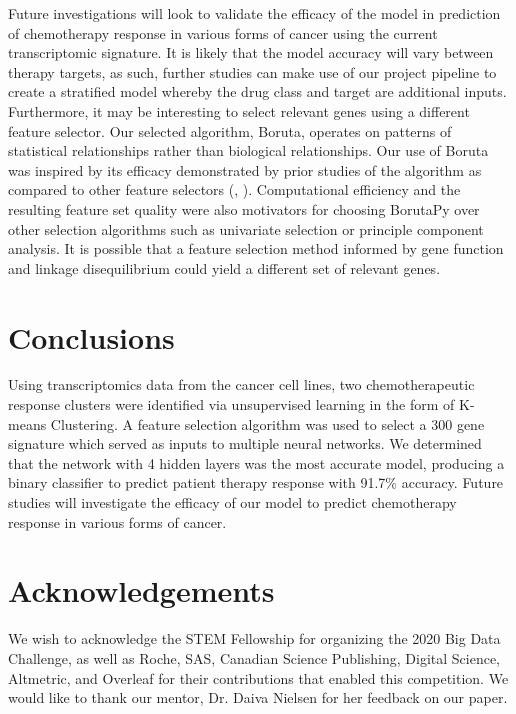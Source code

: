 \documentclass[10pt, letterpaper]{article}
\begin{document}
\begin{multicols}{2}
Future investigations will look to validate the efficacy of the model in prediction of chemotherapy response in various forms of cancer using the current transcriptomic signature. It is likely that the model accuracy will vary between therapy targets, as such, further studies can make use of our project pipeline to create a stratified model whereby the drug class and target are additional inputs. Furthermore, it may be interesting to select relevant genes using a different feature selector. Our selected algorithm, Boruta, operates on patterns of statistical relationships rather than biological relationships. Our use of Boruta was inspired by its efficacy demonstrated by prior studies of the algorithm as compared to other feature selectors (\cite{boruta}, \cite{deep_cell}). Computational efficiency and the resulting feature set quality were also motivators for choosing BorutaPy over other selection algorithms such as univariate selection or principle component analysis. It is possible that a feature selection method informed by gene function and linkage disequilibrium could yield a different set of relevant genes.



\section{Conclusions}
Using transcriptomics data from the cancer cell lines, two chemotherapeutic response clusters were identified via unsupervised learning in the form of K-means Clustering. A feature selection algorithm was used to select a 300 gene signature which served as inputs to multiple neural networks. We determined that the network with 4 hidden layers was the most accurate model, producing a binary classifier to predict patient therapy response with 91.7\% accuracy. Future studies will investigate the efficacy of our model to predict chemotherapy response in various forms of cancer.


\section*{Acknowledgements}
We wish to acknowledge the STEM Fellowship for organizing the 2020 Big Data Challenge, as well as Roche, SAS, Canadian Science Publishing, Digital Science, Altmetric, and Overleaf for their contributions that enabled this competition. We would like to thank our mentor, Dr. Daiva Nielsen for her feedback on our paper.




\end{multicols}
\end{document}
